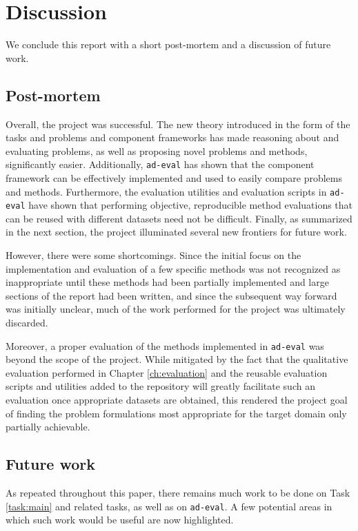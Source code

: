 \chapter{Discussion}
\label{ch:discussion}

We conclude this report with a short post-mortem and a discussion of future work.

\section{Post-mortem}

Overall, the project was successful. The new theory introduced in the form of the tasks and problems and component frameworks has made reasoning about and evaluating problems, as well as proposing novel problems and methods, significantly easier. Additionally, \texttt{ad-eval} has shown that the component framework can be effectively implemented and used to easily compare problems and methods. Furthermore, the evaluation utilities and evaluation scripts in \texttt{ad-eval} have shown that performing objective, reproducible method evaluations that can be reused with different datasets need not be difficult. Finally, as summarized in the next section, the project illuminated several new frontiers for future work.

However, there were some shortcomings. Since the initial focus on the implementation and evaluation of a few specific methods was not recognized as inappropriate until these methods had been partially implemented and large sections of the report had been written, and since the subsequent way forward was initially unclear, much of the work performed for the project was ultimately discarded.

Moreover, a proper evaluation of the methods implemented in \texttt{ad-eval} was beyond the scope of the project. While mitigated by the fact that the qualitative evaluation performed in Chapter \ref{ch:evaluation} and the reusable evaluation scripts and utilities added to the repository will greatly facilitate such an evaluation once appropriate datasets are obtained, this rendered the project goal of finding the problem formulations most appropriate for the target domain only partially achievable.

\section{Future work}

As repeated throughout this paper, there remains much work to be done on Task \ref{task:main} and related tasks, as well as on \texttt{ad-eval}. A few potential areas in which such work would be useful are now highlighted.

